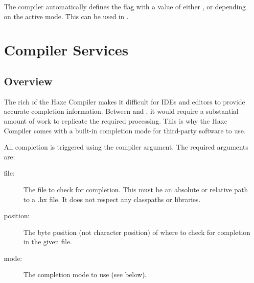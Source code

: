 The compiler automatically defines the flag  with a value of either ,  or  depending on the active mode. This can be used in .






\section{Compiler Services}
\label{cr-completion}

\subsection{Overview}
\label{cr-completion-overview}

The rich  of the Haxe Compiler makes it difficult for IDEs and editors to provide accurate completion information. Between  and , it would require a substantial amount of work to replicate the required processing. This is why the Haxe Compiler comes with a built-in completion mode for third-party software to use.

All completion is triggered using the  compiler argument. The required arguments are:

\begin{description}
	\item[file:] The file to check for completion. This must be an absolute or relative path to a .hx file. It does not respect any classpaths or libraries.
	\item[position:] The byte position (not character position) of where to check for completion in the given file.
	\item[mode:] The completion mode to use (see below).
\end{description}

